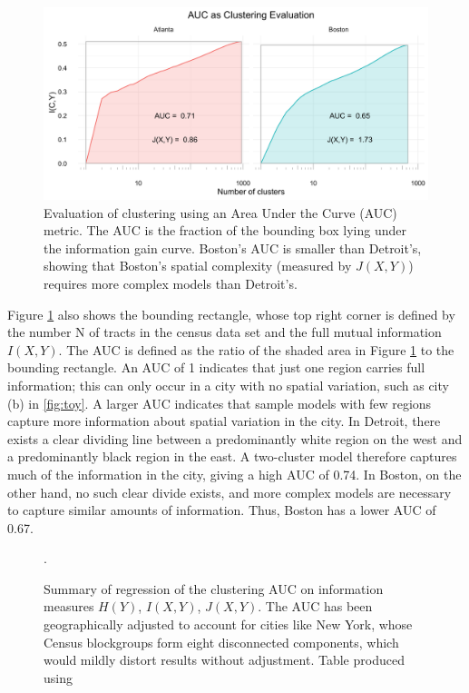 	\begin{figure}
		\centering
		\includegraphics[width=\textwidth]{figs/AUC_illustration.png}
		\caption{Evaluation of clustering using an Area Under the Curve (AUC) metric. The AUC is the fraction of the bounding box lying under the information gain curve. Boston's AUC is smaller than Detroit's, showing that Boston's spatial complexity (measured by $J(X,Y)$) requires more complex models than Detroit's.}
		\label{fig:AUC}
	\end{figure}

	Figure \ref{fig:AUC} also shows the bounding rectangle, whose top right corner is defined by the number N of tracts in the census data set and the full mutual information $I(X,Y)$. The AUC is defined as the ratio of the shaded area in Figure \ref{fig:AUC} to the bounding rectangle. An AUC of 1 indicates that just one region carries full information; this can only occur in a city with no spatial variation, such as city (b) in \ref{fig:toy}. A larger AUC indicates that sample models with few regions capture more information about spatial variation in the city. In Detroit, there exists a clear dividing line between a predominantly white region on the west and a predominantly black region in the east. A two-cluster model therefore captures much of the information in the city, giving a high AUC of 0.74. In Boston, on the other hand, no such clear divide exists, and more complex models are necessary to capture similar amounts of information. Thus, Boston has a lower AUC of 0.67. 

	\begin{figure}
		\centering
		

		\caption{Summary of regression of the clustering AUC on information measures $H(Y)$, $I(X,Y)$, $J(X,Y)$. The AUC has been geographically adjusted to account for cities like New York, whose Census blockgroups form eight disconnected components, which would mildly distort results without adjustment. Table produced using \cite{Marek2015}}.
		\label{fig:info_and_clusters}
	\end{figure}		

